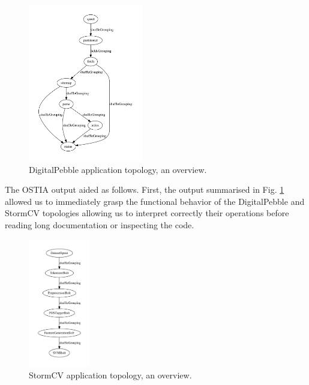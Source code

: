 \begin{figure}
\begin{center}
		\includegraphics[width=5cm]{images/output/crawl}
		\caption{DigitalPebble application topology, an overview.}
		\label{dp}
		\end{center}
\end{figure}

The OSTIA output aided as follows. First, the output summarised in Fig. \ref{dp}
allowed us to immediately grasp the functional behavior of the DigitalPebble and
StormCV topologies allowing us to interpret correctly their operations before
reading long documentation or inspecting the code.

\begin{figure}
\begin{center}
		\includegraphics[width=2.7cm]{images/output/senti_storm}
		\caption{StormCV application topology, an overview.}
		\label{scv}
\end{center}
\end{figure}


